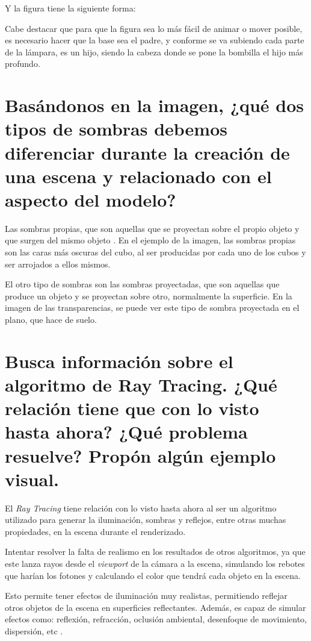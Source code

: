\documentclass{article}
\begin{document}
Y la figura tiene la siguiente forma:


Cabe destacar que para que la figura sea lo más fácil de animar o mover posible, es necesario hacer que la base sea el padre, y conforme se va subiendo cada parte de la lámpara, es un hijo, siendo la cabeza donde se pone la bombilla el hijo más profundo.

\section{Basándonos en la imagen, ¿qué dos tipos de sombras debemos diferenciar durante la creación de una escena y relacionado con el aspecto del modelo?}


Las sombras propias, que son aquellas que se proyectan sobre el propio objeto y que surgen del mismo objeto \cite{sombras}. En el ejemplo de la imagen, las sombras propias son las caras más oscuras del cubo, al ser producidas por cada uno de los cubos y ser arrojados a ellos mismos.


El otro tipo de sombras son las sombras proyectadas, que son aquellas que produce un objeto y se proyectan sobre otro, normalmente la superficie. En la imagen de las transparencias, se puede ver este tipo de sombra proyectada en el plano, que hace de suelo.


\section{Busca información sobre el algoritmo de Ray Tracing. ¿Qué relación tiene que con lo visto hasta ahora? ¿Qué problema resuelve? Propón algún ejemplo visual.}

El \textit{Ray Tracing} tiene relación con lo visto hasta ahora al ser un algoritmo utilizado para generar la iluminación, sombras y reflejos, entre otras muchas propiedades, en la escena durante el renderizado.

Intentar resolver la falta de realismo en los resultados de otros algoritmos, ya que este lanza rayos desde el \textit{viewport} de la cámara a la escena, simulando los rebotes que harían los fotones y calculando el color que tendrá cada objeto en la escena. 

Esto permite tener efectos de iluminación muy realistas, permitiendo reflejar otros objetos de la escena en superficies reflectantes. Además, es capaz de simular efectos como: reflexión, refracción, oclusión ambiental, desenfoque de movimiento, dispersión, etc \cite{raytracing}.
\end{document}
